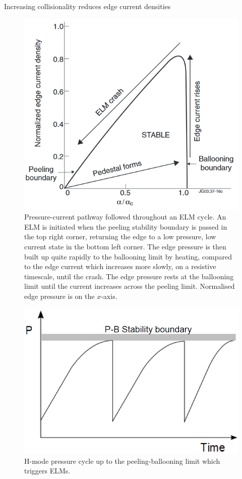 \documentclass[12pt]{article}  %
\begin{document}
Increasing collisionality reduces edge current densities 

\begin{figure}
\includegraphics[scale=0.5]{Figures/ELMcrash.png}
\centering
\caption{Pressure-current pathway followed throughout an ELM cycle\cite{Perez2004}. An ELM is initiated when the peeling stability boundary is passed in the top right corner, returning the edge to a low pressure, low current state in the bottom left corner. The edge pressure is then built up quite rapidly to the ballooning limit by heating, compared to the edge current which increases more slowly, on a resistive timescale, until the crash. The edge pressure rests at the ballooning limit until the current increases across the peeling limit. Normalised edge pressure is on the $x$-axis.}\label{fig:PBcrash}
\end{figure}

\begin{figure}
\includegraphics[scale=0.3]{Figures/PBboundary.png}
\centering
\caption{H-mode pressure cycle up to the peeling-ballooning limit which triggers ELMs.\cite{KirkFF}}\label{fig:PBboundary}
\end{figure}
\end{document}

